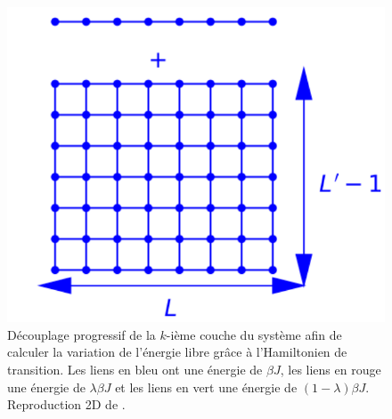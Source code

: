 \begin{figure}
\begin{minipage}[t]{0.32\linewidth}
		\caption*{$H(\lambda)$}		
	\end{minipage}
	\centering
	\begin{minipage}[t]{0.32\linewidth}
		\includegraphics[width=\linewidth]{numerical/cross-h1.pdf}
		\caption*{$H_1$}
	\end{minipage}
	\caption{Découplage progressif de la $k$-ième couche du système afin de calculer la variation de l'énergie libre grâce à l'Hamiltonien de transition. Les liens en bleu ont une énergie de $\beta J$, les liens en rouge une énergie de $\lambda \beta J $ et les liens en vert une énergie de $ (1-\lambda) \beta J$. Reproduction 2D de \cite{vasilyev_monte_2007}.}
	\label{decouplage}
\end{figure}

